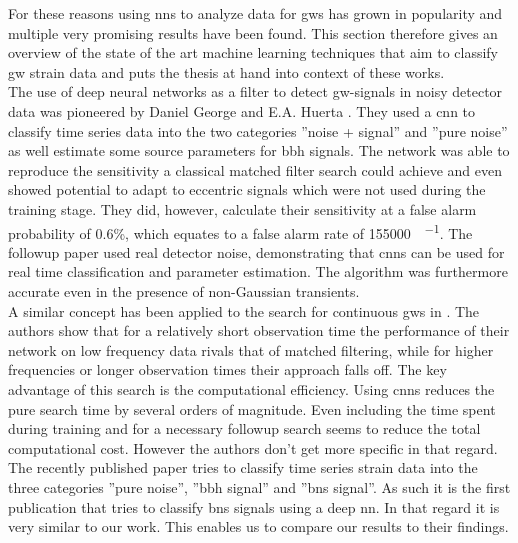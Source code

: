 For these reasons using \gls{nn}s to analyze data for \gls{gw}s has grown in popularity and multiple very promising results have been found. This section therefore gives an overview of the state of the art machine learning techniques that aim to classify \gls{gw} strain data and puts the thesis at hand into context of these works.\\
The use of deep neural networks as a filter to detect \gls{gw}-signals in noisy detector data was pioneered by Daniel George and E.A. Huerta \cite{original_deep_filtering}. They used a \gls{cnn} to classify time series data into the two categories ''noise + signal'' and ''pure noise'' as well estimate some source parameters for \gls{bbh} signals. The network was able to reproduce the sensitivity a classical matched filter search could achieve and even showed potential to adapt to eccentric signals which were not used during the training stage. They did, however, calculate their sensitivity at a false alarm probability of 0.6\%, which equates to a false alarm rate of \SI[per-mode=fraction]{155000}{\samples\per\month}. The followup paper \cite{huerta_parameter_estimation} used real detector noise, demonstrating that \gls{cnn}s can be used for real time classification and parameter estimation. The algorithm was furthermore accurate even in the presence of non-Gaussian transients.\\
A similar concept has been applied to the search for continuous \gls{gw}s in \cite{paper_christoph}. The authors show that for a relatively short observation time the performance of their network on low frequency data rivals that of matched filtering, while for higher frequencies or longer observation times their approach falls off. The key advantage of this search is the computational efficiency. Using \gls{cnn}s reduces the pure search time by several orders of magnitude. Even including the time spent during training and for a necessary followup search seems to reduce the total computational cost. However the authors don't get more specific in that regard.\\
The recently published paper \cite{bns_network} tries to classify time series strain data into the three categories ''pure noise'', ''\gls{bbh} signal'' and ''\gls{bns} signal''. As such it is the first publication that tries to classify \gls{bns} signals using a deep \gls{nn}. In that regard it is very similar to our work. This enables us to compare our results to their findings.\\

